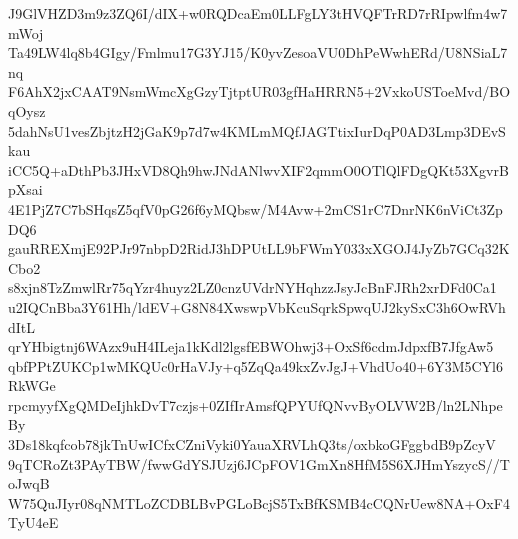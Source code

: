 J9GlVHZD3m9z3ZQ6I/dIX+w0RQDcaEm0LLFgLY3tHVQFTrRD7rRIpwlfm4w7mWoj
Ta49LW4lq8b4GIgy/Fmlmu17G3YJ15/K0yvZesoaVU0DhPeWwhERd/U8NSiaL7nq
F6AhX2jxCAAT9NsmWmcXgGzyTjtptUR03gfHaHRRN5+2VxkoUSToeMvd/BOqOysz
5dahNsU1vesZbjtzH2jGaK9p7d7w4KMLmMQfJAGTtixIurDqP0AD3Lmp3DEvSkau
iCC5Q+aDthPb3JHxVD8Qh9hwJNdANlwvXIF2qmmO0OTlQlFDgQKt53XgvrBpXsai
4E1PjZ7C7bSHqsZ5qfV0pG26f6yMQbsw/M4Avw+2mCS1rC7DnrNK6nViCt3ZpDQ6
gauRREXmjE92PJr97nbpD2RidJ3hDPUtLL9bFWmY033xXGOJ4JyZb7GCq32KCbo2
s8xjn8TzZmwlRr75qYzr4huyz2LZ0cnzUVdrNYHqhzzJsyJcBnFJRh2xrDFd0Ca1
u2IQCnBba3Y61Hh/ldEV+G8N84XwswpVbKcuSqrkSpwqUJ2kySxC3h6OwRVhdItL
qrYHbigtnj6WAzx9uH4ILeja1kKdl2lgsfEBWOhwj3+OxSf6cdmJdpxfB7JfgAw5
qbfPPtZUKCp1wMKQUc0rHaVJy+q5ZqQa49kxZvJgJ+VhdUo40+6Y3M5CYl6RkWGe
rpcmyyfXgQMDeIjhkDvT7czjs+0ZIfIrAmsfQPYUfQNvvByOLVW2B/ln2LNhpeBy
3Ds18kqfcob78jkTnUwICfxCZniVyki0YauaXRVLhQ3ts/oxbkoGFggbdB9pZcyV
9qTCRoZt3PAyTBW/fwwGdYSJUzj6JCpFOV1GmXn8HfM5S6XJHmYszycS//ToJwqB
W75QuJIyr08qNMTLoZCDBLBvPGLoBcjS5TxBfKSMB4cCQNrUew8NA+OxF4TyU4eE
